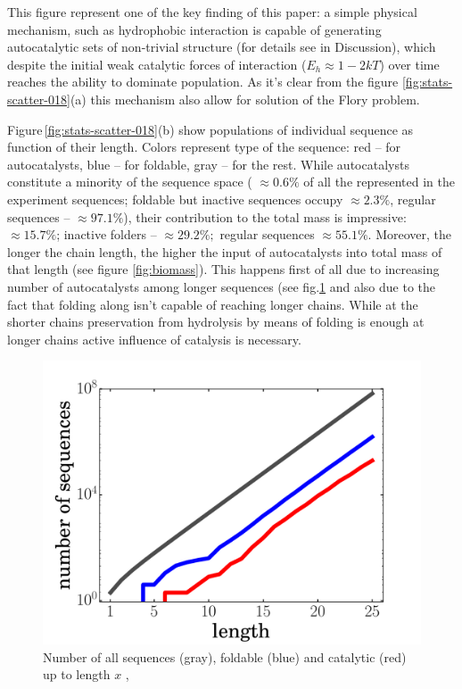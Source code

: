 \documentclass[journal=jacsat,manuscript=article,layout=twocolumn]{achemso}
\begin{document}
This figure represent one of the key finding of this paper: a simple physical mechanism, such as 
hydrophobic interaction is capable of generating autocatalytic sets of non-trivial structure (for 
details see in Discussion), which despite the initial weak catalytic forces of 
interaction ($E_h\approx 1-2kT$) over time reaches the ability to dominate population. As it's 
clear from the figure \ref{fig:stats-scatter-018}(a) this mechanism also allow for solution of the 
Flory 
problem.

Figure\,\ref{fig:stats-scatter-018}(b) show populations of individual sequence as function of their 
length. Colors represent type of the sequence: red -- for autocatalysts, blue -- for foldable, gray 
-- for the rest. While autocatalysts constitute a minority of the sequence space ( $\approx 0.6\%$ 
of all the represented in the experiment sequences; foldable but inactive sequences occupy $\approx 
2.3\%$, regular sequences -- $\approx97.1\%$), their contribution to the total mass is impressive: 
$\approx 15.7\%$; inactive folders -- $\approx 29.2\%;$ regular sequences $\approx 55.1\%$. 
Moreover, the longer the chain length, the higher the input of autocatalysts into total mass of 
that length (see figure \ref{fig:biomass}). This happens first of all due to increasing number of 
autocatalysts among longer sequences (see fig.\ref{fig:hp-statistics} and also due to the fact that 
folding along isn't capable of reaching longer chains. While at the shorter chains preservation 
from hydrolysis by means of folding is enough at longer chains active influence of catalysis is 
necessary.
\begin{figure}[hbt!]
  \centering
  \includegraphics[width=\columnwidth]{pictures/hp-statistics.pdf} 
  \caption{\footnotesize{Number of all sequences (gray), foldable (blue) and catalytic (red) up to 
length $x$ , }}
  \label{fig:hp-statistics}
\end{figure}
\end{document}
